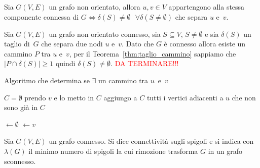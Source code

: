 \begin{thm}
Sia $G(V,E)$ un grafo non orientato, allora ${u,v \in V}$ appartengono alla stessa 
componente connessa di ${G \iff \delta(S) \neq \emptyset \text{ } \forall 
\delta(S\neq \emptyset)}$ che separa $u$ e~$v$.
\end{thm}
\proof
Sia ${G(V,E)}$ un grafo non orientato connesso, sia ${S \subseteq V}$, ${S \neq \emptyset}$ e
sia $\delta(S)$ un taglio di~$G$ che separa due nodi $u$ e~$v$. Dato che $G$ è connesso allora
esiste un cammino $P$ tra $u$ e~$v$, per il Teorema~\ref{thm:taglio_cammino} sappiamo che
${ |P \cap \delta(S)| \geqslant 1 }$ quindi ${\delta(S) \neq \emptyset}$.
\textcolor{red}{DA TERMINARE!!!}
\endproof

\begin{algorithm}
\caption{Algoritmo che determina se $\exists$ un cammino tra $u$~e~$v$ }\label{alg:algo_bipartizione}
\begin{algorithmic}
\STATE $C = \emptyset$
\STATE prendo $v$ e lo metto in $C$ 
\STATE {}
    \STATE aggiungo a $C$ tutti i vertici adiacenti a $u$ che non sono già in $C$
\ENDFOR
\STATE {}

\end{algorithmic}
\end{algorithm}

\begin{codebox}
\li {}
\li {}
\li {} $\gets \emptyset$
\li {} $\leftarrow v$ 
\li {}
\li \li \li
\Do
\li
\li
\end{codebox}

\begin{defn}
Sia ${G(V,E)}$ un grafo connesso. Si dice connettività
sugli spigoli e si indica con~$\lambda(G)$ il minimo numero di spigoli la cui rimozione 
trasforma $G$ in un grafo sconnesso.
\end{defn}


